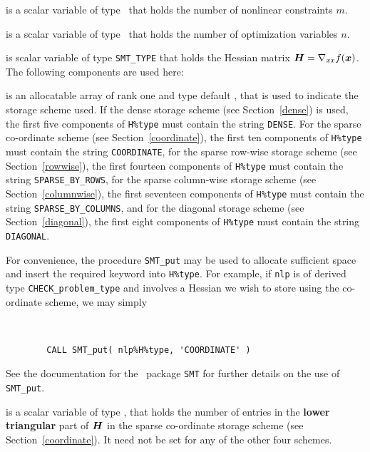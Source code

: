 \documentclass{galahad}
\newcommand{\packagename}{CHECK}
\begin{document}
\begin{description}

 is a scalar variable of type \integer\ 
 that holds the number of nonlinear constraints $m$.  

 is a scalar variable of type \integer\ 
 that holds the number of optimization variables $n$.  
              
\ittf{H} is scalar variable of type {\tt SMT\_TYPE} 
that holds the Hessian matrix ${\bm{H}}=\nabla_{xx}f({\bm{x}})$. The following components
are used here:

\begin{description}

 is an allocatable array of rank one and type default 
\character, that
is used to indicate the storage scheme used. If the dense storage scheme 
(see Section~\ref{dense}) is used, 
the first five components of {\tt H\%type} must contain the
string {\tt DENSE}.
For the sparse co-ordinate scheme (see Section~\ref{coordinate}), 
the first ten components of {\tt H\%type} must contain the
string {\tt COORDINATE},  
for the sparse row-wise storage scheme (see Section~\ref{rowwise}),
the first fourteen components of {\tt H\%type} must contain the
string {\tt SPARSE\_BY\_ROWS},
for the sparse column-wise storage scheme (see Section~\ref{columnwise}),
the first seventeen components of {\tt H\%type} must contain the
string {\tt SPARSE\_BY\_COLUMNS},
and for the diagonal storage scheme (see Section~\ref{diagonal}),
the first eight components of {\tt H\%type} must contain the
string {\tt DIAGONAL}.

For convenience, the procedure {\tt SMT\_put} 
may be used to allocate sufficient space and insert the required keyword
into {\tt H\%type}.
For example, if {\tt nlp} is of derived type {\tt \packagename\_problem\_type}
and involves a Hessian we wish to store using the co-ordinate scheme,
we may simply
{\tt 
\begin{verbatim}
        CALL SMT_put( nlp%H%type, 'COORDINATE' )
\end{verbatim}
}
\noindent
See the documentation for the \galahad\ package {\tt SMT} 
for further details on the use of {\tt SMT\_put}.

 is a scalar variable of type \integer, that 
holds the number of entries in the {\bf lower triangular} part of ${\bm{H}}$
in the sparse co-ordinate storage scheme (see Section~\ref{coordinate}). 
It need not be set for any of the other four schemes.


\end{description}
\end{description}
\end{document}
